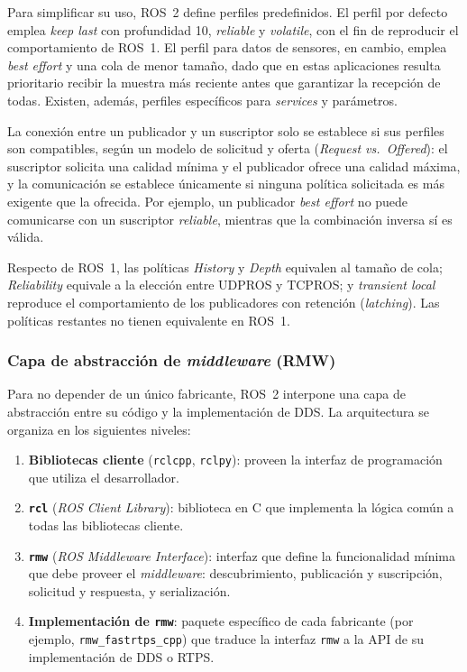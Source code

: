 Para simplificar su uso, ROS~2 define perfiles predefinidos. El perfil por
defecto emplea \textit{keep last} con profundidad 10, \textit{reliable} y
\textit{volatile}, con el fin de reproducir el comportamiento de ROS~1. El
perfil para datos de sensores, en cambio, emplea \textit{best effort} y una cola
de menor tamaño, dado que en estas aplicaciones resulta prioritario recibir la
muestra más reciente antes que garantizar la recepción de todas. Existen,
además, perfiles específicos para \textit{services} y parámetros.

La conexión entre un publicador y un suscriptor solo se establece si sus
perfiles son compatibles, según un modelo de solicitud y oferta
(\textit{Request vs.\ Offered}): el suscriptor solicita una calidad mínima y el
publicador ofrece una calidad máxima, y la comunicación se establece únicamente
si ninguna política solicitada es más exigente que la ofrecida. Por ejemplo, un
publicador \textit{best effort} no puede comunicarse con un suscriptor
\textit{reliable}, mientras que la combinación inversa sí es válida.

Respecto de ROS~1, las políticas \textit{History} y \textit{Depth} equivalen al
tamaño de cola; \textit{Reliability} equivale a la elección entre UDPROS y
TCPROS; y \textit{transient local} reproduce el comportamiento de los
publicadores con retención (\textit{latching}). Las políticas restantes no
tienen equivalente en ROS~1.

\subsubsection{Capa de abstracción de \textit{middleware} (RMW)}

Para no depender de un único fabricante, ROS~2 interpone una capa de
abstracción entre su código y la implementación de DDS. La arquitectura se
organiza en los siguientes niveles:
\begin{enumerate}
    \item \textbf{Bibliotecas cliente} (\texttt{rclcpp}, \texttt{rclpy}):
    proveen la interfaz de programación que utiliza el desarrollador.
    \item \textbf{\texttt{rcl}} (\textit{ROS Client Library}): biblioteca en C
    que implementa la lógica común a todas las bibliotecas cliente.
    \item \textbf{\texttt{rmw}} (\textit{ROS Middleware Interface}): interfaz
    que define la funcionalidad mínima que debe proveer el \textit{middleware}:
    descubrimiento, publicación y suscripción, solicitud y respuesta, y
    serialización.
    \item \textbf{Implementación de \texttt{rmw}}: paquete específico de cada
    fabricante (por ejemplo, \texttt{rmw\_fastrtps\_cpp}) que traduce la
    interfaz \texttt{rmw} a la API de su implementación de DDS o RTPS.
\end{enumerate}

